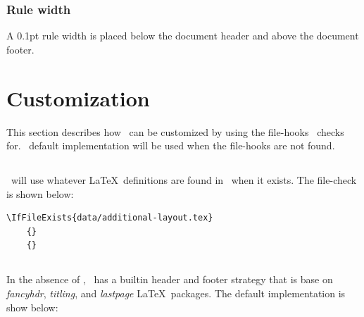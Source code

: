 \documentclass[12pt]{tlc-article}
\begin{document}

\subsubsection*{Rule width}
A 0.1pt rule width is placed below the document header and above the document
footer.


\clearpage
\section{Customization}
This section describes how \tlcA\ can be customized by using the file-hooks
\tlcA\ checks for.  \tlcA\ default implementation will be used when the
file-hooks are not found.

\tlcVspace

%


\subsection{\tlcAL}
\tlcA\ will use whatever \LaTeX\ definitions are found in \tlcAL\ when it
exists.  The file-check is shown below:

\begin{lstlisting}[basicstyle=\tiny]
  \IfFileExists{data/additional-layout.tex}
    {}
    {}
\end{lstlisting}


\subsection{\tlcHF}
In the absence of \tlcHF, \tlcA\ has a builtin header and footer strategy that
is base on \textit{fancyhdr}, \textit{titling}, and \textit{lastpage} \LaTeX\
packages. The default implementation is show below:
\end{document}
